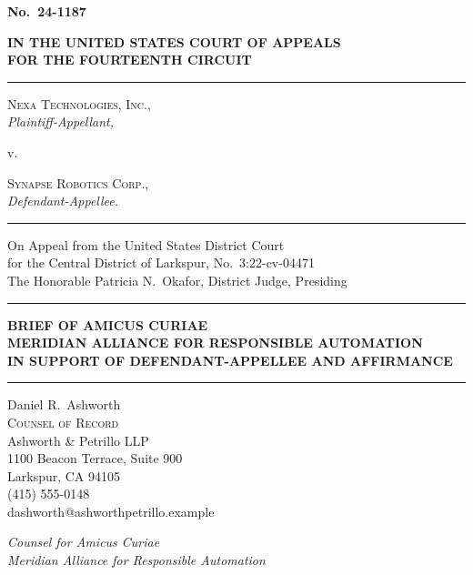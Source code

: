 
\thispagestyle{empty}
\begin{center}

\textbf{No.\ 24-1187}

\vspace{18pt}
{\bfseries\large IN THE UNITED STATES COURT OF APPEALS}\\[2pt]
{\bfseries\large FOR THE FOURTEENTH CIRCUIT}

\vspace{28pt}
\rule{\linewidth}{0.8pt}
\end{center}

\begin{flushleft}
\textsc{Nexa Technologies, Inc.,}\\
\hspace*{0.6in}\textit{Plaintiff-Appellant,}

\vspace{6pt}
\hspace*{1.4in} v.

\vspace{6pt}
\textsc{Synapse Robotics Corp.,}\\
\hspace*{0.6in}\textit{Defendant-Appellee.}
\end{flushleft}

\begin{center}
\rule{\linewidth}{0.8pt}
\vspace{10pt}

On Appeal from the United States District Court\\
for the Central District of Larkspur, No.\ 3:22-cv-04471\\
The Honorable Patricia N.\ Okafor, District Judge, Presiding

\vspace{28pt}
\rule{\linewidth}{0.4pt}

\vspace{14pt}
{\bfseries\large BRIEF OF AMICUS CURIAE\\[3pt]
MERIDIAN ALLIANCE FOR RESPONSIBLE AUTOMATION\\[3pt]
IN SUPPORT OF DEFENDANT-APPELLEE AND AFFIRMANCE}

\vspace{14pt}
\rule{\linewidth}{0.4pt}

\vfill

\begin{minipage}{3.6in}
\raggedright
\small
Daniel R.\ Ashworth\\
\textsc{Counsel of Record}\\
Ashworth \& Petrillo LLP\\
1100 Beacon Terrace, Suite 900\\
Larkspur, CA 94105\\
(415) 555-0148\\
dashworth@ashworthpetrillo.example

\medskip
\textit{Counsel for Amicus Curiae}\\
\textit{Meridian Alliance for Responsible Automation}
\end{minipage}

\end{center}
\newpage

